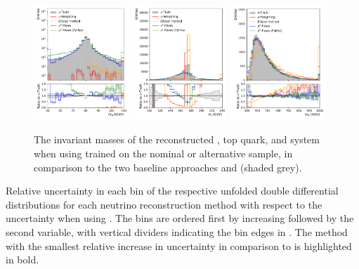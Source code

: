 \begin{figure}[htbp]
    \centering
    \includegraphics[width=0.32\textwidth]{Figures/neutrino_unfolding/pythia8/W_plusW_minus_m.pdf}
    \includegraphics[width=0.32\textwidth]{Figures/neutrino_unfolding/pythia8/topanti_top_m.pdf}
    \includegraphics[width=0.32\textwidth]{Figures/neutrino_unfolding/pythia8/ttbar_m.pdf}
    \caption{
        The invariant masses of the reconstructed \Wboson, top quark, and \ttbar system when using \vvflows trained on the nominal or alternative sample, in comparison to the two baseline approaches and \vtruth (shaded grey).
    }
\label{fig:pythiattbar}
\end{figure}

\begin{table}[thp]
    \centering
    \caption{Relative uncertainty in each bin of the respective unfolded double differential distributions for each neutrino reconstruction method with respect to the uncertainty when using \vtruth. The bins are ordered first by increasing \mttbar followed by the second variable, with vertical dividers indicating the bin edges in \mttbar. The method with the smallest relative increase in uncertainty in comparison to \vtruth is highlighted in bold.}
    \label{tab:app:rel_unfold_uncerts}
    \resizebox{\textwidth}{!}{
        
    }
\end{table}

